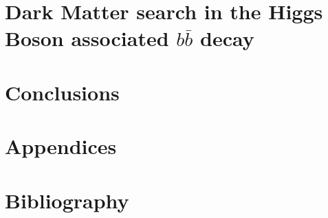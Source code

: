 \documentclass[11pt,openright,oneside,letterpaper,onecolumn]{report}  %
\begin{document}
\part{Dark Matter search in the Higgs Boson associated $b\bar{b}$ decay}
\label{sec:analysis-part}


\part{Conclusions}
\label{sec:conclusions}


\part{Appendices}
\appendix



\part{Bibliography}


\end{document}
